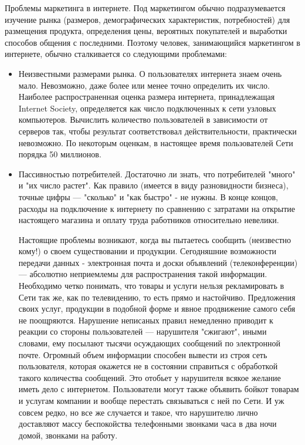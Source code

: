 \documentclass[a4paper,english,russian]{G2-105}
\begin{document}
\par Проблемы маркетинга в интернете. Под маркетингом обычно подразумевается изучение рынка (размеров, демографических характеристик, потребностей) для размещения продукта, определения цены, вероятных покупателей и выработки способов общения с последними. Поэтому человек, занимающийся маркетингом в интернете, обычно сталкивается со следующими проблемами:
\begin{itemize}
\item Неизвестными размерами рынка. О пользователях интернета знаем очень мало. Невозможно, даже более или менее точно определить их число. Наиболее распространенная оценка размера интернета, принадлежащая Internet Society, определяется как число подключенных к сети узловых компьютеров. Вычислить количество пользователей в зависимости от серверов так, чтобы результат соответствовал действительности, практически невозможно. По некоторым оценкам, в настоящее время пользователей Сети порядка 50 миллионов.
\item Пассивностью потребителей. Достаточно ли знать, что потребителей "много" и "их число растет". Как правило (имеется в виду разновидности бизнеса), точные цифры --- "сколько" и "как быстро" - не нужны. В конце концов, расходы на подключение к интернету по сравнению с затратами на открытие настоящего магазина и оплату труда работников относительно невелики.
\par Настоящие проблемы возникают, когда вы пытаетесь сообщить (неизвестно кому!) о своем существовании и продукции. Сегодняшние возможности передачи данных - электронная почта и доски объявлений (телеконференции) --- абсолютно неприемлемы для распространения такой информации. Необходимо четко понимать, что товары и услуги нельзя рекламировать в Сети так же, как по телевидению, то есть прямо и настойчиво. Предложения своих услуг, продукции в подобной форме и явное продвижение самого себя не поощряются. Нарушение неписаных правил немедленно приводит к реакции со стороны пользователей --- нарушителя "сжигают", иными словами, ему посылают тысячи осуждающих сообщений по электронной почте. Огромный объем информации способен вывести из строя сеть пользователя, которая окажется не в состоянии справиться с обработкой такого количества сообщений. Это отобьет у нарушителя всякое желание иметь дело с интернетом. Пользователи могут также объявить бойкот товарам и услугам компании и вообще перестать связываться с ней по Сети. И уж совсем редко, но все же случается и такое, что нарушителю лично доставляют массу беспокойства телефонными звонками часа в два ночи домой, звонками на работу.

\end{itemize}
\end{document}
